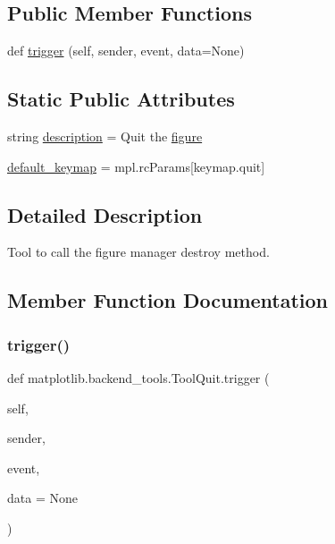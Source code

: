 \subsection*{Public Member Functions}
\begin{DoxyCompactItemize}
\item 
def \hyperlink{classmatplotlib_1_1backend__tools_1_1ToolQuit_a6572e51863fd4f4f3e293571b834bcd1}{trigger} (self, sender, event, data=None)
\end{DoxyCompactItemize}
\subsection*{Static Public Attributes}
\begin{DoxyCompactItemize}
\item 
string \hyperlink{classmatplotlib_1_1backend__tools_1_1ToolQuit_ab6518832a8dde5cd75449fc2856c0703}{description} = \textquotesingle{}Quit the \hyperlink{classmatplotlib_1_1backend__tools_1_1ToolBase_af85e83d1db0787aa40d06837204651ee}{figure}\textquotesingle{}
\item 
\hyperlink{classmatplotlib_1_1backend__tools_1_1ToolQuit_a2df7f88c6bb8d638bc5f5f97e2b584d0}{default\+\_\+keymap} = mpl.\+rc\+Params\mbox{[}\textquotesingle{}keymap.\+quit\textquotesingle{}\mbox{]}
\end{DoxyCompactItemize}


\subsection{Detailed Description}
\begin{DoxyVerb}Tool to call the figure manager destroy method.\end{DoxyVerb}
 

\subsection{Member Function Documentation}
\mbox{\label{classmatplotlib_1_1backend__tools_1_1ToolQuit_a6572e51863fd4f4f3e293571b834bcd1}} 
\subsubsection{\texorpdfstring{trigger()}{trigger()}}
{\footnotesize\ttfamily def matplotlib.\+backend\+\_\+tools.\+Tool\+Quit.\+trigger (\begin{DoxyParamCaption}\item[{}]{self,  }\item[{}]{sender,  }\item[{}]{event,  }\item[{}]{data = {\ttfamily None} }\end{DoxyParamCaption})}



